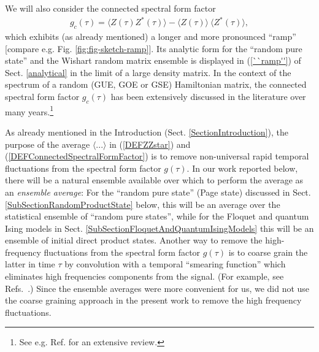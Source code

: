 \documentclass[aps,prb,preprint,onecolumn,amsmath,amssymb,superscriptaddress,eqsecnum,floatfix,scrartcl]{revtex4-1}
\begin{document}
We will also consider the connected spectral form factor
\begin{eqnarray}
\label{DEFConnectedSpectralFormFactor}
g_c(\tau) =   \langle Z(\tau) Z^*(\tau)\rangle -  \langle Z(\tau)\rangle \ \langle Z^*(\tau)\rangle,
\end{eqnarray}
which 
exhibits (as already mentioned) a longer and more pronounced ``ramp'' [compare e.g. Fig. \ref{fig:fig-sketch-ramp}]. 
Its analytic form for the ``random pure state'' and the Wishart random matrix ensemble 
is displayed
 in (\ref{``ramp''}) of
Sect. \ref{analytical}
 in the limit of a large density matrix.
In the context of  the spectrum of a  random (GUE, GOE or GSE)  Hamiltonian matrix, 
the connected spectral form factor $g_c(\tau)$ has been extensively discussed in the literature over many years.\footnote{See
e.g. Ref.  for an extensive  review.}







As already mentioned in the Introduction (Sect. \ref{SectionIntroduction}), the purpose of the average $\langle ... \rangle$
in (\ref{DEFZZstar}) and (\ref{DEFConnectedSpectralFormFactor})
 is to remove non-universal rapid temporal fluctuations\cite{Prange1997} from the spectral form factor $g(\tau)$. 
In our work reported below, there will be a natural ensemble available  over which to perform the average as an {\it ensemble average}:
For the ``random pure state'' (Page state) discussed  in Sect. \ref{SubSectionRandomProductState} below,  this will be  an average over the statistical
ensemble of ``random pure states'', while for the Floquet and  quantum Ising models in Sect. \ref{SubSectionFloquetAndQuantumIsingModels}
this will be an ensemble of initial direct product states.
Another way to remove the high-frequency fluctuations from the spectral form factor $g(\tau)$
is to coarse grain the latter in time  $\tau$  by convolution with
a temporal  ``smearing function'' which eliminates high frequencies components from  the signal.  (For example, see Refs.\ .) Since the ensemble averages were more convenient
for us, we did not  use the coarse graining approach in the present work to remove the high frequency fluctuations.
\end{document}

